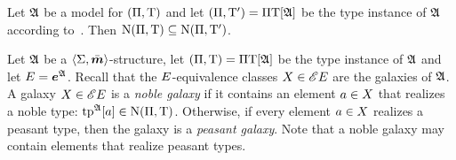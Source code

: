 \begin{remark}\label{rem:str-tpi-noble-sub}
Let $\mathfrak{A}$ be a model for $(\Pi,\mathrm{T})$ and let $(\Pi,{\mathrm{T}'}) =
\Pi\mathrm{T}[\mathfrak{A}]$ be the type instance of $\mathfrak{A}$ according
to~.
Then $\mathrm{\mathrm{N}}(\Pi,\mathrm{T}) \subseteq \mathrm{\mathrm{N}}(\Pi,{\mathrm{T}'})$.
\end{remark}

\begin{definition}
Let $\mathfrak{A}$ be a $\left\langle \mathrm{\Sigma},\bar{\bm{m}} \right\rangle$-structure,
let $(\Pi,\mathrm{T}) = \Pi\mathrm{T}[\mathfrak{A}]$ be the type instance of $\mathfrak{A}$ and
let $E = \bm{e}^{\mathfrak{A}}$. Recall that the $E$-equivalence classes $X \in
{\mathscr{E}E}$ are the galaxies of $\mathfrak{A}$.
A galaxy $X \in {\mathscr{E}E}$ is a \emph{noble galaxy} if it contains an
element $a \in X$ that realizes a noble type: $\operatorname{tp}^{\mathfrak{A}}[a] \in
\mathrm{\mathrm{N}}(\Pi,\mathrm{T})$. Otherwise, if every element $a \in X$ realizes a peasant
type, then the galaxy is a \emph{peasant galaxy}.
Note that a noble galaxy may contain elements that realize peasant types.
\end{definition}

